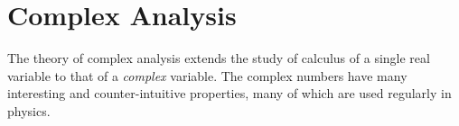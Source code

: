 \chapter{Complex Analysis}
    The theory of complex analysis extends the study of calculus of a
    single real variable to that of a \textit{complex} variable. The
    complex numbers have many interesting and counter-intuitive properties,
    many of which are used regularly in physics.
    